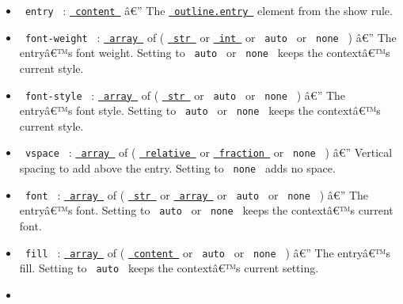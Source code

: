 \begin{itemize}
\tightlist
\item
  \texttt{\ entry\ } :
  \href{https://typst.app/docs/reference/foundations/content/}{\texttt{\ content\ }}
  â€'' The
  \href{https://typst.app/docs/reference/model/outline/\#definitions-entry}{\texttt{\ outline.entry\ }}
  element from the show rule.
\item
  \texttt{\ font-weight\ } :
  \href{https://typst.app/docs/reference/foundations/array/}{\texttt{\ array\ }}
  of (
  \href{https://typst.app/docs/reference/foundations/str/}{\texttt{\ str\ }}
  or
  \href{https://typst.app/docs/reference/foundations/int/}{\texttt{\ int\ }}
  or \texttt{\ auto\ } or \texttt{\ none\ } ) â€'' The entryâ€™s font
  weight. Setting to \texttt{\ auto\ } or \texttt{\ none\ } keeps the
  contextâ€™s current style.
\item
  \texttt{\ font-style\ } :
  \href{https://typst.app/docs/reference/foundations/array/}{\texttt{\ array\ }}
  of (
  \href{https://typst.app/docs/reference/foundations/str/}{\texttt{\ str\ }}
  or \texttt{\ auto\ } or \texttt{\ none\ } ) â€'' The entryâ€™s font
  style. Setting to \texttt{\ auto\ } or \texttt{\ none\ } keeps the
  contextâ€™s current style.
\item
  \texttt{\ vspace\ } :
  \href{https://typst.app/docs/reference/foundations/array/}{\texttt{\ array\ }}
  of (
  \href{https://typst.app/docs/reference/layout/relative/}{\texttt{\ relative\ }}
  or
  \href{https://typst.app/docs/reference/layout/fraction/}{\texttt{\ fraction\ }}
  or \texttt{\ none\ } ) â€'' Vertical spacing to add above the entry.
  Setting to \texttt{\ none\ } adds no space.
\item
  \texttt{\ font\ } :
  \href{https://typst.app/docs/reference/foundations/array/}{\texttt{\ array\ }}
  of (
  \href{https://typst.app/docs/reference/foundations/str/}{\texttt{\ str\ }}
  or
  \href{https://typst.app/docs/reference/foundations/array/}{\texttt{\ array\ }}
  or \texttt{\ auto\ } or \texttt{\ none\ } ) â€'' The entryâ€™s font.
  Setting to \texttt{\ auto\ } or \texttt{\ none\ } keeps the
  contextâ€™s current font.
\item
  \texttt{\ fill\ } :
  \href{https://typst.app/docs/reference/foundations/array/}{\texttt{\ array\ }}
  of (
  \href{https://typst.app/docs/reference/foundations/content/}{\texttt{\ content\ }}
  or \texttt{\ auto\ } or \texttt{\ none\ } ) â€'' The entryâ€™s fill.
  Setting to \texttt{\ auto\ } keeps the contextâ€™s current setting.
\item

\end{itemize}
